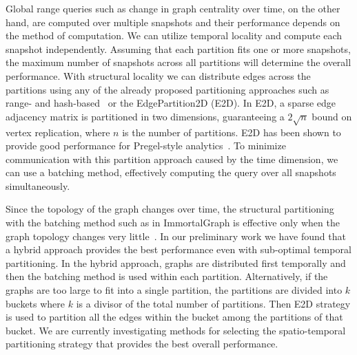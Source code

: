 Global range queries such as change in graph centrality over time, on
the other hand, are computed over multiple snapshots and their
performance depends on the method of computation.  We can utilize
temporal locality and compute each snapshot independently.  Assuming
that each partition fits one or more snapshots, the maximum number of
snapshots across all partitions will determine the overall
performance.  With structural locality we can distribute edges across
the partitions using any of the already proposed partitioning
approaches such as range- and hash-based~\cite{Seo2013} or the
EdgePartition2D (E2D).  In E2D, a sparse edge adjacency matrix is
partitioned in two dimensions, guaranteeing a $2 \sqrt{n}$ bound on
vertex replication, where $n$ is the number of partitions. E2D has
been shown to provide good performance for Pregel-style
analytics~\cite{DBLP:conf/osdi/GonzalezXDCFS14}.  To minimize
communication with this partition approach caused by the time
dimension, we can use a batching method, effectively computing the
query over all snapshots simultaneously.  

Since the topology of the graph changes over time, the structural
partitioning with the batching method such as in ImmortalGraph is
effective only when the graph topology changes very
little~\cite{MoffittTempWeb16}.  In our preliminary work we have found
that a hybrid approach provides the best performance even with
sub-optimal temporal partitioning.  In the hybrid approach, graphs are
distributed first temporally and then the batching method is used
within each partition.  Alternatively, if the graphs are too large to
fit into a single partition, the partitions are divided into $k$
buckets where $k$ is a divisor of the total number of partitions.
Then E2D strategy is used to partition all the edges within the bucket
among the partitions of that bucket.  We are currently investigating
methods for selecting the spatio-temporal partitioning strategy that
provides the best overall performance.
